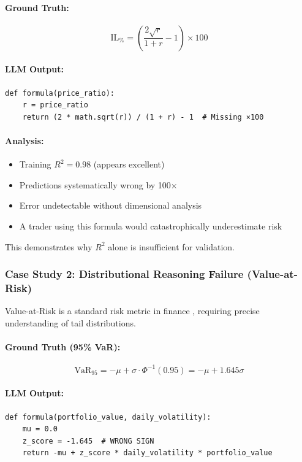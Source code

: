 \documentclass[twoside,11pt]{article}
\begin{document}
\paragraph{Ground Truth:}
\begin{equation}
\text{IL}_{\%} = \left(\frac{2\sqrt{r}}{1+r} - 1\right) \times 100
\end{equation}

\paragraph{LLM Output:}
\begin{verbatim}
def formula(price_ratio):
    r = price_ratio
    return (2 * math.sqrt(r)) / (1 + r) - 1  # Missing ×100
\end{verbatim}

\paragraph{Analysis:}
\begin{itemize}
\item Training $R^2 = 0.98$ (appears excellent)
\item Predictions systematically wrong by 100$\times$
\item Error undetectable without dimensional analysis
\item A trader using this formula would catastrophically underestimate risk
\end{itemize}

This demonstrates why $R^2$ alone is insufficient for validation.

\subsubsection{Case Study 2: Distributional Reasoning Failure (Value-at-Risk)}

Value-at-Risk is a standard risk metric in finance \citep{rockafellar2000optimization,danielsson2017forecasting}, requiring precise understanding of tail distributions.

\paragraph{Ground Truth (95\% VaR):}
\begin{equation}
\text{VaR}_{95} = -\mu + \sigma \cdot \Phi^{-1}(0.95) = -\mu + 1.645\sigma
\end{equation}

\paragraph{LLM Output:}
\begin{verbatim}
def formula(portfolio_value, daily_volatility):
    mu = 0.0
    z_score = -1.645  # WRONG SIGN
    return -mu + z_score * daily_volatility * portfolio_value
\end{verbatim}
\end{document}
